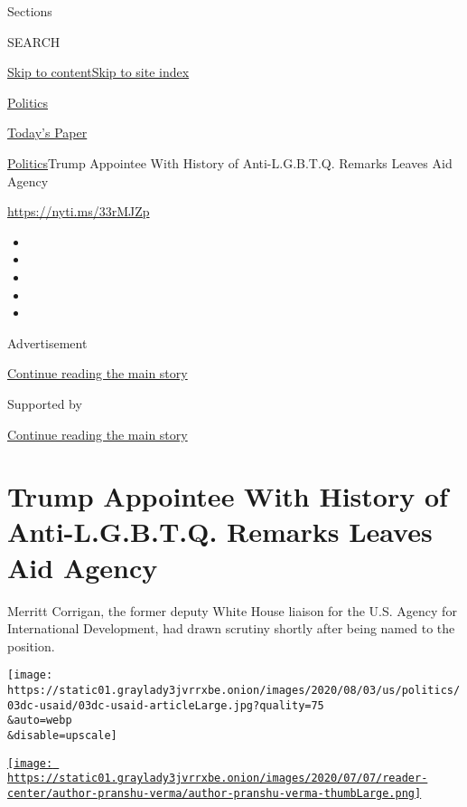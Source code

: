 Sections

SEARCH

\protect\hyperlink{site-content}{Skip to
content}\protect\hyperlink{site-index}{Skip to site index}

\href{https://www.nytimes3xbfgragh.onion/section/politics}{Politics}

\href{https://myaccount.nytimes3xbfgragh.onion/auth/login?response_type=cookie\&client_id=vi}{}

\href{https://www.nytimes3xbfgragh.onion/section/todayspaper}{Today's
Paper}

\href{/section/politics}{Politics}\textbar{}Trump Appointee With History
of Anti-L.G.B.T.Q. Remarks Leaves Aid Agency

\url{https://nyti.ms/33rMJZp}

\begin{itemize}
\item
\item
\item
\item
\item
\end{itemize}

Advertisement

\protect\hyperlink{after-top}{Continue reading the main story}

Supported by

\protect\hyperlink{after-sponsor}{Continue reading the main story}

\hypertarget{trump-appointee-with-history-of-anti-lgbtq-remarks-leaves-aid-agency}{%
\section{Trump Appointee With History of Anti-L.G.B.T.Q. Remarks Leaves
Aid
Agency}\label{trump-appointee-with-history-of-anti-lgbtq-remarks-leaves-aid-agency}}

Merritt Corrigan, the former deputy White House liaison for the U.S.
Agency for International Development, had drawn scrutiny shortly after
being named to the position.

\texttt{[image: https://static01.graylady3jvrrxbe.onion/images/2020/08/03/us/politics/03dc-usaid/03dc-usaid-articleLarge.jpg?quality=75\\\&auto=webp\\\&disable=upscale]}

\href{https://www.nytimes3xbfgragh.onion/by/pranshu-verma}{\texttt{[image: https://static01.graylady3jvrrxbe.onion/images/2020/07/07/reader-center/author-pranshu-verma/author-pranshu-verma-thumbLarge.png]}}

